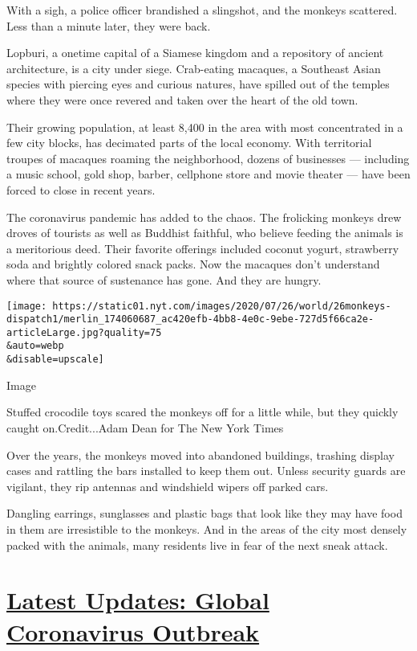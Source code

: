 With a sigh, a police officer brandished a slingshot, and the monkeys
scattered. Less than a minute later, they were back.

Lopburi, a onetime capital of a Siamese kingdom and a repository of
ancient architecture, is a city under siege. Crab-eating macaques, a
Southeast Asian species with piercing eyes and curious natures, have
spilled out of the temples where they were once revered and taken over
the heart of the old town.

Their growing population, at least 8,400 in the area with most
concentrated in a few city blocks, has decimated parts of the local
economy. With territorial troupes of macaques roaming the neighborhood,
dozens of businesses --- including a music school, gold shop, barber,
cellphone store and movie theater --- have been forced to close in
recent years.

The coronavirus pandemic has added to the chaos. The frolicking monkeys
drew droves of tourists as well as Buddhist faithful, who believe
feeding the animals is a meritorious deed. Their favorite offerings
included coconut yogurt, strawberry soda and brightly colored snack
packs. Now the macaques don't understand where that source of sustenance
has gone. And they are hungry.

\texttt{[image: https://static01.nyt.com/images/2020/07/26/world/26monkeys-dispatch1/merlin\_174060687\_ac420efb-4bb8-4e0c-9ebe-727d5f66ca2e-articleLarge.jpg?quality=75\\\&auto=webp\\\&disable=upscale]}

Image

Stuffed crocodile toys scared the monkeys off for a little while, but
they quickly caught on.Credit...Adam Dean for The New York Times

Over the years, the monkeys moved into abandoned buildings, trashing
display cases and rattling the bars installed to keep them out. Unless
security guards are vigilant, they rip antennas and windshield wipers
off parked cars.

Dangling earrings, sunglasses and plastic bags that look like they may
have food in them are irresistible to the monkeys. And in the areas of
the city most densely packed with the animals, many residents live in
fear of the next sneak attack.

\hypertarget{latest-updates-global-coronavirus-outbreak}{%
\section{\texorpdfstring{\href{https://www.nytimes.com/2020/08/03/world/coronavirus-covid-19.html?action=click\&pgtype=Article\&state=default\&region=MAIN_CONTENT_1\&context=storylines_live_updates}{Latest
Updates: Global Coronavirus
Outbreak}}{Latest Updates: Global Coronavirus Outbreak}}\label{latest-updates-global-coronavirus-outbreak}}

